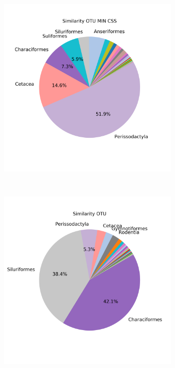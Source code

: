 \begin{figure}[h]
\begin{subfigure}{0.45\textwidth}
		\includegraphics[width=\textwidth]{rfr_dis_mean_pieOTU MIN CSS}
		\caption{}
		\label{fig:dissimotumincssmean}
	\end{subfigure}\\
	\begin{subfigure}{0.45\textwidth}
	\includegraphics[width=\textwidth]{rfr_dis_sum_pieOTU}

\end{subfigure}
\end{figure}
